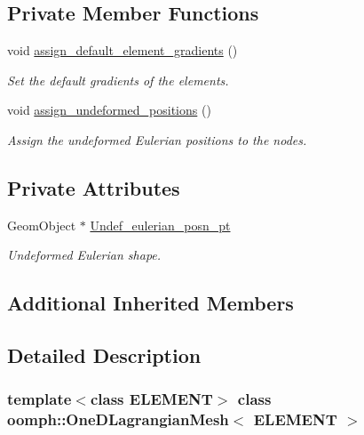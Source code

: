 \subsection*{Private Member Functions}
\begin{DoxyCompactItemize}
\item 
void \hyperlink{classoomph_1_1OneDLagrangianMesh_a7a4eabf4901a90b3015d2620fc70f648}{assign\+\_\+default\+\_\+element\+\_\+gradients} ()
\begin{DoxyCompactList}\small\item\em Set the default gradients of the elements. \end{DoxyCompactList}\item 
void \hyperlink{classoomph_1_1OneDLagrangianMesh_a1eebb0eddd75a7c2847615c05b5fb4d8}{assign\+\_\+undeformed\+\_\+positions} ()
\begin{DoxyCompactList}\small\item\em Assign the undeformed Eulerian positions to the nodes. \end{DoxyCompactList}\end{DoxyCompactItemize}
\subsection*{Private Attributes}
\begin{DoxyCompactItemize}
\item 
Geom\+Object $\ast$ \hyperlink{classoomph_1_1OneDLagrangianMesh_af9b27f687d7ec160a01d6ed8c07570ed}{Undef\+\_\+eulerian\+\_\+posn\+\_\+pt}
\begin{DoxyCompactList}\small\item\em Undeformed Eulerian shape. \end{DoxyCompactList}\end{DoxyCompactItemize}
\subsection*{Additional Inherited Members}


\subsection{Detailed Description}
\subsubsection*{template$<$class E\+L\+E\+M\+E\+NT$>$\newline
class oomph\+::\+One\+D\+Lagrangian\+Mesh$<$ E\+L\+E\+M\+E\+N\+T $>$}

